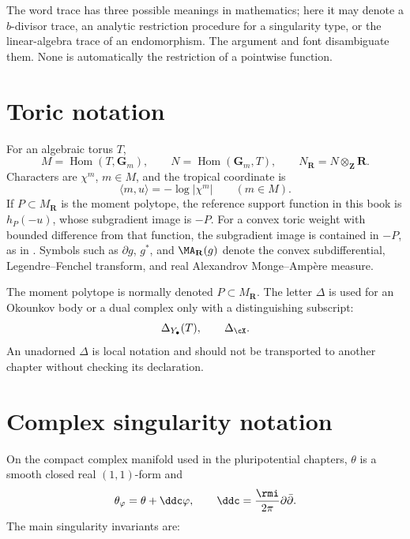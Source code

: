 The word trace has three possible meanings in mathematics; here it may
denote a \(b\)-divisor trace, an analytic restriction procedure for a
singularity type, or the linear-algebra trace of an endomorphism.  The
argument and font disambiguate them.  None is automatically the restriction
of a pointwise function.

\section{Toric notation}
\label{sec:appK-toric}


For an algebraic torus \(T\),
\[
 M=\operatorname{Hom}(T,\mathbf G_m),
 \qquad
 N=\operatorname{Hom}(\mathbf G_m,T),
 \qquad
 N_{\mathbf R}=N\otimes_{\mathbf Z}\mathbf R.
\]
Characters are \(\chi^m\), \(m\in M\), and the tropical coordinate is
\[
 \langle m,u\rangle=-\log|\chi^m|\qquad(m\in M).
\]
If \(P\subset M_{\mathbf R}\) is the moment polytope, the reference support
function in this book is \(h_P(-u)\), whose subgradient image is \(-P\).
For a convex toric weight with bounded difference from that function, the
subgradient image is contained in \(-P\), as in .
Symbols such as
\(\partial g\), \(g^*\), and \(\MA_{\mathbf R}(g)\) denote the convex
subdifferential, Legendre--Fenchel transform, and real Alexandrov
Monge--Amp\`ere measure.

The moment polytope is normally denoted \(P\subset M_{\mathbf R}\).
The letter \(\Delta\) is used for an Okounkov body or a dual complex only
with a distinguishing subscript:
\[
 \Delta_{Y_\bullet}(T),\qquad \Delta_\cX.
\]
An unadorned \(\Delta\) is local notation and should not be transported to
another chapter without checking its declaration.

\section{Complex singularity notation}
\label{sec:appK-complex}


On the compact complex manifold used in the pluripotential chapters, \(\theta\) is a smooth closed real
\((1,1)\)-form and
\[
 \theta_\varphi=\theta+\ddc\varphi,
 \qquad
 \ddc=\frac{\rmi}{2\pi}\partial\bar\partial.
\]
The main singularity invariants are:

